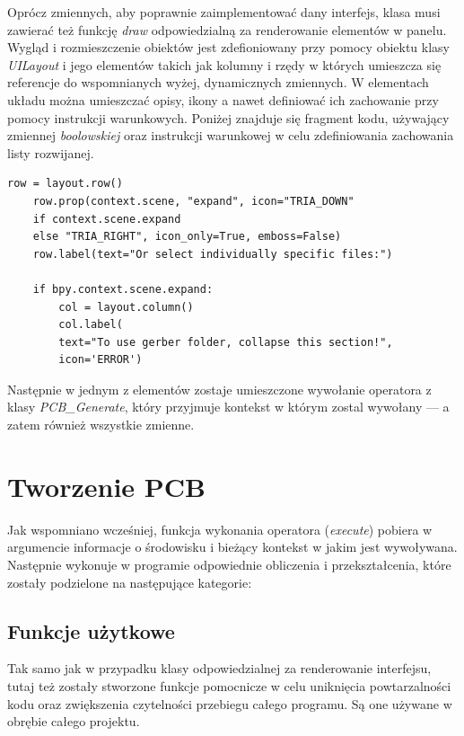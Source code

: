 \documentclass{xmgr}
\begin{document}
Oprócz zmiennych, aby poprawnie zaimplementować dany interfejs, klasa musi zawierać też funkcję \emph{draw} odpowiedzialną za renderowanie elementów w panelu. Wygląd i rozmieszczenie obiektów jest zdefioniowany przy pomocy obiektu klasy \emph{UILayout} i jego elementów takich jak kolumny i rzędy w których umieszcza się referencje do wspomnianych wyżej, dynamicznych zmiennych. 
W elementach układu można umieszczać opisy, ikony a nawet definiować ich zachowanie przy pomocy instrukcji warunkowych. Poniżej znajduje się fragment kodu, używający zmiennej \emph{boolowskiej} oraz instrukcji warunkowej w celu zdefiniowania zachowania listy rozwijanej.

\begin{lstlisting}
row = layout.row()
	row.prop(context.scene, "expand", icon="TRIA_DOWN"
	if context.scene.expand
	else "TRIA_RIGHT", icon_only=True, emboss=False)
	row.label(text="Or select individually specific files:")

	if bpy.context.scene.expand:
		col = layout.column()
		col.label(
		text="To use gerber folder, collapse this section!",
		icon='ERROR')
\end{lstlisting}

Następnie w jednym z elementów zostaje umieszczone wywołanie operatora z klasy \emph{PCB\_Generate}, który przyjmuje kontekst w którym zostal wywołany --- a zatem również wszystkie zmienne.


\section {Tworzenie PCB}
Jak wspomniano wcześniej, funkcja wykonania operatora (\emph{execute}) pobiera w argumencie informacje o środowisku i bieżący kontekst w jakim jest wywoływana. Następnie wykonuje w programie odpowiednie obliczenia i przekształcenia, które zostały podzielone na następujące kategorie:
\subsection{Funkcje użytkowe}
Tak samo jak w przypadku klasy odpowiedzialnej za renderowanie interfejsu, tutaj też zostały stworzone funkcje pomocnicze w celu uniknięcia powtarzalności kodu oraz zwiększenia czytelności przebiegu całego programu. Są one używane w obrębie całego projektu.
\end{document}
